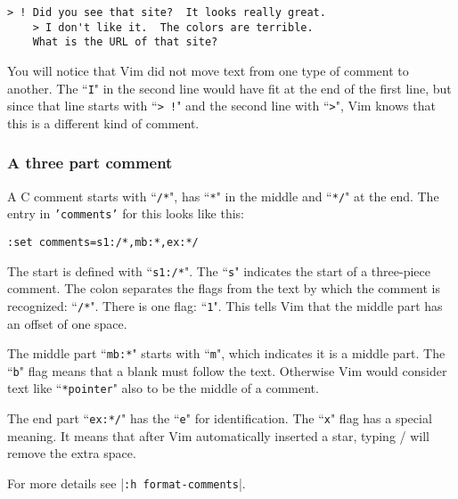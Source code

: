 \begin{Verbatim}[samepage=true]
    > ! Did you see that site?  It looks really great.
    > I don't like it.  The colors are terrible.
    What is the URL of that site?
\end{Verbatim}

You will notice that Vim did not move text from one type of comment to another.
The ``\texttt{I}" in the second line would have fit at the end of the first line, but since that line starts with ``\texttt{> !}" and the second line with ``\texttt{>}", Vim knows that this is a different kind of comment.

\subsubsection{A three part comment}
A C comment starts with ``\texttt{/*}", has ``\texttt{*}" in the middle and ``\texttt{*/}" at the end.
The entry in \texttt{'comments'} for this looks like this:

\begin{Verbatim}[samepage=true]
 :set comments=s1:/*,mb:*,ex:*/
\end{Verbatim}

The start is defined with ``\texttt{s1:/*}".
The ``\texttt{s}" indicates the start of a three-piece comment.
The colon separates the flags from the text by which the comment is recognized: ``\texttt{/*}".
There is one flag: ``\texttt{1}".
This tells Vim that the middle part has an offset of one space.

The middle part ``\texttt{mb:*}" starts with ``\texttt{m}", which indicates it is a middle part.
The ``\texttt{b}" flag means that a blank must follow the text.
Otherwise Vim would consider text like ``\texttt{*pointer}" also to be the middle of a comment.

The end part ``\texttt{ex:*/}" has the ``\texttt{e}" for identification.
The ``\texttt{x}" flag has a special meaning.
It means that after Vim automatically inserted a star, typing / will remove the extra space.

For more details see |\texttt{:h format-comments}|.
\clearpage
